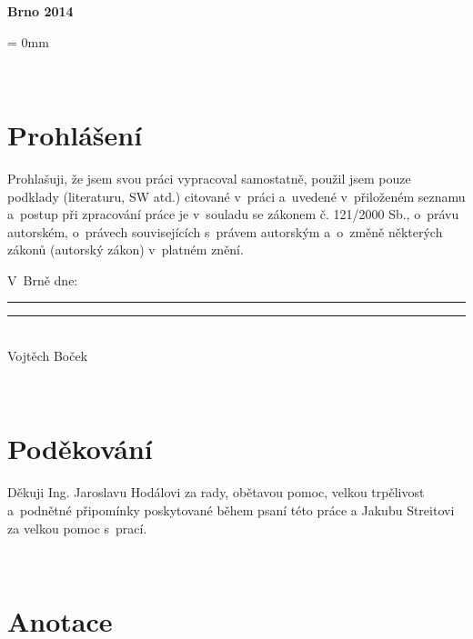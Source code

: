 \documentclass[12pt, a4paper, oneside]{article}
\newcommand{\B}{\textbf} %
\begin{document}
\vspace{20mm}

\begin{center}
\B{Brno 2014}

\end{center}
\normalsize
\newpage  %
\voffset = 0mm %

~ %

\vspace{10mm}

\section*{Prohlášení}

Prohlašuji, že jsem svou práci vypracoval samostatně, použil jsem pouze podklady (literaturu, SW atd.) citované v~práci a~uvedené v~přiloženém seznamu a~postup při zpracování práce je v~souladu se zákonem č. 121/2000 Sb., o~právu autorském, o~právech souvisejících s~právem autorským a~o~změně některých zákonů (autorský zákon) v~platném znění.

\vspace{10mm}

\noindent \parbox{\textwidth}{
\noindent V~Brně dne: \rule{4cm}{1pt}
\hfill\parbox{5cm}{
    \centering
    \vspace{9mm}
    \rule{5cm}{1pt}\\
        Vojtěch Boček
}
}
 

\newpage   %

~ %
\vspace{150mm}

\section*{Poděkování}
Děkuji Ing. Jaroslavu Hodálovi za rady, obětavou pomoc, velkou trpělivost a~podnětné připomínky poskytované během psaní této práce a Jakubu \mbox{Streitovi} za velkou pomoc s~prací.
 

\newpage   %
~ %
\vspace{-20mm}

\section*{Anotace}
\end{document}
